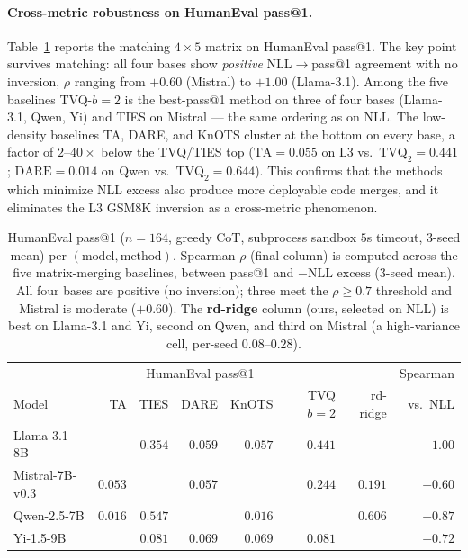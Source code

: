 \paragraph{Cross-metric robustness on HumanEval pass@1.}
Table~\ref{tab:b4-humaneval} reports the matching $4 \times 5$
matrix on HumanEval pass@1. The key point survives matching: all
four bases show \emph{positive} NLL$\to$pass@1 agreement with no
inversion, $\rho$ ranging from $+0.60$ (Mistral) to $+1.00$
(Llama-3.1). Among the five baselines TVQ-$b{=}2$ is the best-pass@1
method on three of four bases (Llama-3.1, Qwen, Yi) and TIES on
Mistral --- the same ordering as on NLL. The low-density baselines
TA, DARE, and KnOTS cluster at the bottom on every base, a factor of
$2$--$40\times$ below the TVQ/TIES top ($\mathrm{TA} = 0.055$ on L3 vs.\
$\mathrm{TVQ}_2 = 0.441$; $\mathrm{DARE} = 0.014$ on Qwen vs.\
$\mathrm{TVQ}_2 = 0.644$). This confirms that the methods which
minimize NLL excess also produce more deployable code merges,
and it eliminates the L3 GSM8K inversion as a cross-metric
phenomenon.

\begin{table}[t]
\centering
\caption{HumanEval pass@1 ($n = 164$, greedy CoT, subprocess
sandbox $5$s timeout, $3$-seed mean) per $(\text{model},
\text{method})$. Spearman $\rho$ (final column) is computed across the
five matrix-merging baselines, between pass@1 and $-\text{NLL excess}$
($3$-seed mean). All four bases are positive (no inversion); three meet
the $\rho \geq 0.7$ threshold and Mistral is moderate ($+0.60$). The
\textbf{rd-ridge} column (ours, selected on NLL) is best on Llama-3.1
and Yi, second on Qwen, and third on Mistral (a high-variance cell,
per-seed $0.08$--$0.28$).}
\label{tab:b4-humaneval}
\begin{tabular}{lrrrrrr|r}
\hline
\multicolumn{7}{c|}{HumanEval pass@1} & Spearman \\
Model & TA & TIES & DARE & KnOTS & TVQ $b=2$ & rd-ridge & vs.\ NLL \\
\hline
Llama-3.1-8B    & \worst{$0.055$} & $0.354$ & $0.059$ & $0.057$ & $0.441$ & \best{$0.457$} & $+1.00$ \\
Mistral-7B-v0.3 & $0.053$ & \best{$0.250$} & $0.057$ & \worst{$0.045$} & $0.244$ & $0.191$ & $+0.60$ \\
Qwen-2.5-7B     & $0.016$ & $0.547$ & \worst{$0.014$} & $0.016$ & \best{$0.644$} & $0.606$ & $+0.87$ \\
Yi-1.5-9B       & \worst{$0.061$} & $0.081$ & $0.069$ & $0.069$ & $0.081$ & \best{$0.108$} & $+0.72$ \\
\hline
\end{tabular}
\end{table}

